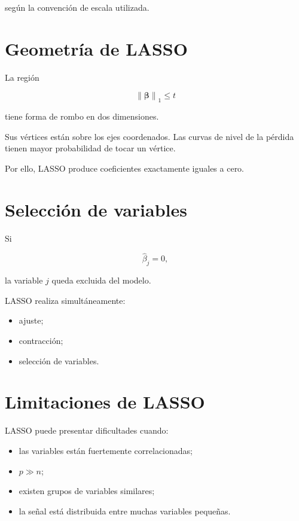 \documentclass[
  spanish,
  10.5pt,
  letterpaper,
  DIV=11,
  numbers=noendperiod,
  oneside,
  open=any]{scrreprt}
\providecommand{\tightlist}{%
  \setlength{\itemsep}{0pt}\setlength{\parskip}{0pt}}
\theoremstyle{definition}
\theoremstyle{definition}
\theoremstyle{plain}
\theoremstyle{remark}
\begin{document}
según la convención de escala utilizada.

\section*{Geometría de LASSO}\label{geometruxeda-de-lasso}


La región

\[
\left\|
\boldsymbol{\beta}
\right\|_1
\leq
t
\]

tiene forma de rombo en dos dimensiones.

Sus vértices están sobre los ejes coordenados. Las curvas de nivel de la
pérdida tienen mayor probabilidad de tocar un vértice.

Por ello, LASSO produce coeficientes exactamente iguales a cero.

\section*{Selección de variables}\label{selecciuxf3n-de-variables}


Si

\[
\widehat{\beta}_j=0,
\]

la variable \(j\) queda excluida del modelo.

LASSO realiza simultáneamente:

\begin{itemize}
\tightlist
\item
  ajuste;
\item
  contracción;
\item
  selección de variables.
\end{itemize}

\section*{Limitaciones de LASSO}\label{limitaciones-de-lasso}


LASSO puede presentar dificultades cuando:

\begin{itemize}
\tightlist
\item
  las variables están fuertemente correlacionadas;
\item
  \(p\gg n\);
\item
  existen grupos de variables similares;
\item
  la señal está distribuida entre muchas variables pequeñas.
\end{itemize}
\end{document}

